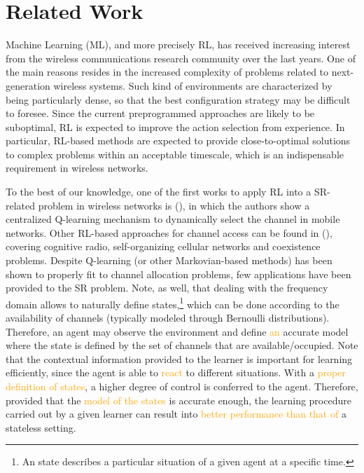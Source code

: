 \documentclass[preprint,12pt]{elsarticle}
\begin{document}
\section{Related Work}
\label{section:previous_work} 		
Machine Learning (ML), and more precisely RL, has received increasing interest from the wireless communications research community over the last years. One of the main reasons resides in the increased complexity of problems related to next-generation wireless systems. Such kind of environments are characterized by being particularly dense, so that the best configuration strategy may be difficult to foresee. Since the current preprogrammed approaches are likely to be suboptimal, RL is expected to improve the action selection from experience. In particular, RL-based methods are expected to provide close-to-optimal solutions to complex problems within an acceptable timescale, which is an indispensable requirement in wireless networks.

To the best of our knowledge, one of the first works to apply RL into a SR-related problem in wireless networks is (\citealp{nie1999q}), in which the authors show a centralized Q-learning mechanism to dynamically select the channel in mobile networks. Other RL-based approaches for channel access can be found in (\citealp{li2009multi, bennis2010q, bennis2011distributed, sallent2015learning, rupasinghe2015reinforcement}), covering cognitive radio, self-organizing cellular networks and coexistence problems. Despite Q-learning (or other Markovian-based methods) has been shown to properly fit to channel allocation problems, few applications have been provided to the SR problem. Note, as well, that dealing with the frequency domain allows to naturally define states,\footnote{An state describes a particular situation of a given agent at a specific time.} which can be done according to the availability of channels (typically modeled through Bernoulli distributions). Therefore, an agent may observe the environment and define \textcolor{orange}{an} accurate model where the state is defined by the set of channels that are available/occupied. Note that the contextual information provided to the learner is important for learning efficiently, since the agent is able to \textcolor{orange}{react} to different situations. With a \textcolor{orange}{proper definition of states}, a higher degree of control is conferred to the agent. Therefore, provided that the \textcolor{orange}{model of the states} is accurate enough, the learning procedure carried out by a given learner can result into \textcolor{orange}{better performance than that of} a stateless setting. 
\end{document}
